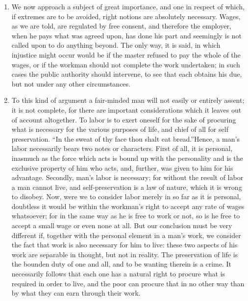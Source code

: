 \documentclass{book}
\begin{document}
\begin{enumerate}
	\item We now approach a subject of great importance, and one in respect of which, if extremes are to be avoided, right notions are absolutely necessary. Wages, as we are told, are regulated by free consent, and therefore the employer, when he pays what was agreed upon, has done his part and seemingly is not called upon to do anything beyond. The only way, it is said, in which injustice might occur would be if the master refused to pay the whole of the wages, or if the workman should not complete the work undertaken; in such cases the public authority should intervene, to see that each obtains his due, but not under any other circumstances.


	\item To this kind of argument a fair-minded man will not easily or entirely assent; it is not complete, for there are important considerations which it leaves out of account altogether. To labor is to exert oneself for the sake of procuring what is necessary for the various purposes of life, and chief of all for self preservation. “In the sweat of thy face thou shalt eat bread.”\footnotemark[31] Hence, a man’s labor necessarily bears two notes or characters. First of all, it is personal, inasmuch as the force which acts is bound up with the personality and is the exclusive property of him who acts, and, further, was given to him for his advantage. Secondly, man’s labor is necessary; for without the result of labor a man cannot live, and self-preservation is a law of nature, which it is wrong to disobey. Now, were we to consider labor merely in so far as it is personal, doubtless it would be within the workman’s right to accept any rate of wages whatsoever; for in the same way as he is free to work or not, so is he free to accept a small wage or even none at all. But our conclusion must be very different if, together with the personal element in a man’s work, we consider the fact that work is also necessary for him to live: these two aspects of his work are separable in thought, but not in reality. The preservation of life is the bounden duty of one and all, and to be wanting therein is a crime. It necessarily follows that each one has a natural right to procure what is required in order to live, and the poor can procure that in no other way than by what they can earn through their work.



\end{enumerate}
\end{document}
